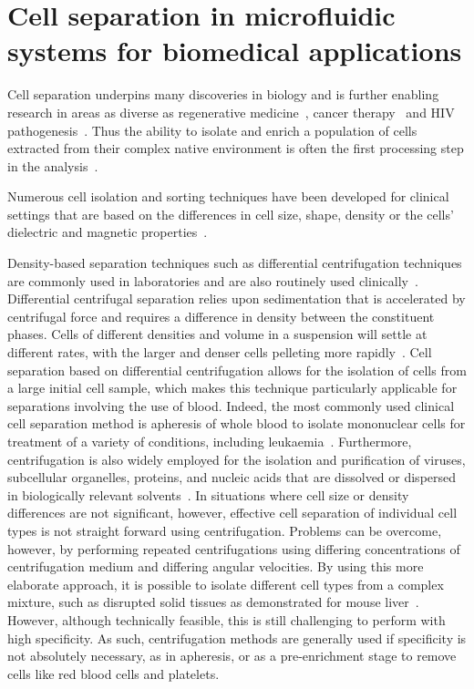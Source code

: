 \section{Cell separation in microfluidic systems for biomedical applications}
Cell separation underpins many discoveries in biology and is further enabling research in areas as diverse as regenerative medicine~\cite{Guo2006,Tomlinson2013}, cancer therapy~\cite{Takaishi2009} and HIV pathogenesis~\cite{Terry2009}. Thus the ability to isolate and enrich a population of cells extracted from their complex native environment is often the first processing step in the analysis~\cite{Tomlinson2013}.

Numerous cell isolation and sorting techniques have been developed for clinical settings that are based on the differences in cell size, shape, density or the cells' dielectric and magnetic properties~\cite{Gossett2010,Tsutsui2009,Lenshof2010}. 

Density-based separation techniques such as differential centrifugation techniques are commonly used in laboratories and are also routinely used clinically~\cite{Miller1969}. Differential centrifugal separation relies upon sedimentation that is accelerated by centrifugal force and requires a difference in density between the constituent phases. Cells of different densities and volume in a suspension will settle at different rates, with the larger and denser cells pelleting more rapidly~\cite{Berg1993}. Cell separation based on differential centrifugation allows for the isolation of cells from a large initial cell sample, which makes this technique particularly applicable for separations involving the use of blood. Indeed, the most commonly used clinical cell separation method is apheresis of whole blood to isolate mononuclear cells for treatment of a variety of conditions, including leukaemia~\cite{Buckner1969}. Furthermore, centrifugation is also widely employed for the isolation and purification of viruses, subcellular organelles, proteins, and nucleic acids that are dissolved or dispersed in biologically relevant solvents~\cite{Duve1975}. In situations where cell size or density differences are not significant, however, effective cell separation of individual cell types is not straight forward using centrifugation. Problems can be overcome, however, by performing repeated centrifugations using differing concentrations of centrifugation medium and differing angular velocities. By using this more elaborate approach, it is possible to isolate different cell types from a complex mixture, such as disrupted solid tissues as demonstrated for mouse liver~\cite{Liu2011}. However, although technically feasible, this is still challenging to perform with high specificity. As such, centrifugation methods are generally used if specificity is not absolutely necessary, as in apheresis, or as a pre-enrichment stage to remove cells like red blood cells and platelets.

